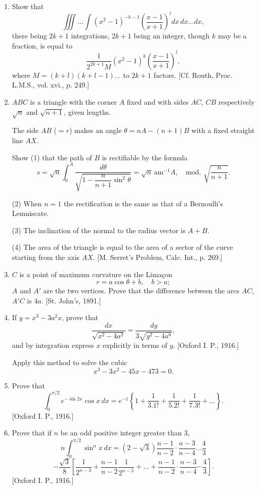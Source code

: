 \documentclass[11pt, a4paper]{article}
\newcommand{\source}[1]{\hfill\textnormal{[#1]}}
\begin{document}
\begin{enumerate}[leftmargin=2em]
\item Show that
\[
\iiint\dots\int(x^2-1)^{-k-1}\left(\frac{x-1}{x+1}\right)^ldx\,dx\dots dx,
\]
there being $2k+1$ integrations, $2k+1$ being an integer, though $k$ may be a fraction, is equal to
\[
\frac{1}{2^{2k+1}M}(x^2-1)^k\left(\frac{x-1}{x+1}\right)^l,
\]
where $M=(k+l)(k+l-1)\dots$ to $2k+1$ factors. \source{Cf. Routh, Proc. L.M.S., vol. xvi., p. 249.}

\item $ABC$ is a triangle with the corner $A$ fixed and with sides $AC$, $CB$ respectively $\sqrt n$ and $\sqrt{n+1}$, given lengths.

The side $AB$ ($=r$) makes an angle $\theta=nA-(n+1)B$ with a fixed straight line $AX$.

Show (1) that the path of $B$ is rectifiable by the formula
\[
s=\sqrt n\int_0^A\frac{d\theta}{\sqrt{1-\dfrac{n}{n+1}\sin^2\theta}}=\sqrt n\,\mathrm{am}^{-1}A,\quad\text{mod. }\sqrt{\frac{n}{n+1}}.
\]

(2) When $n=1$ the rectification is the same as that of a Bernoulli's Lemniscate.

(3) The inclination of the normal to the radius vector is $A+B$.

(4) The area of the triangle is equal to the area of a sector of the curve starting from the axis $AX$. \source{M. Serret's Problem, Calc. Int., p. 269.}

\item $C$ is a point of maximum curvature on the Limaçon
\[
r=a\cos\theta+b,\quad b>a;
\]
$A$ and $A'$ are the two vertices. Prove that the difference between the arcs $AC$, $A'C$ is $4a$. \source{St. John's, 1891.}

\item If $y=x^3-3a^2x$, prove that
\[
\frac{dx}{\sqrt{x^2-4a^2}}=\frac{dy}{3\sqrt{y^2-4a^6}},
\]
and by integration express $x$ explicitly in terms of $y$. \source{Oxford I. P., 1916.}

Apply this method to solve the cubic
\[
x^3-3x^2-45x-473=0.
\]

\item Prove that
\[
\int_0^{\pi/2}e^{-\sin2x}\cos x\,dx=e^{-1}\left\{1+\frac{1}{3.1!}+\frac{1}{5.2!}+\frac{1}{7.3!}+\dots\right\}.
\]
\source{Oxford I. P., 1916.}

\item Prove that if $n$ be an odd positive integer greater than 3,
\[
n\int_0^{\pi/2}\sin^nx\,dx=(2-\sqrt3)\frac{n-1}{n-2}\cdot\frac{n-3}{n-4}\dots\frac43
\]
\[
-\frac{\sqrt3}{8}\left[\frac{1}{2^{n-3}}+\frac{n-1}{n-2}\frac{1}{2^{n-5}}+\dots+\frac{n-1}{n-2}\cdot\frac{n-3}{n-4}\cdots\frac43\right].
\]
\source{Oxford I. P., 1916.}


\end{enumerate}
\end{document}
